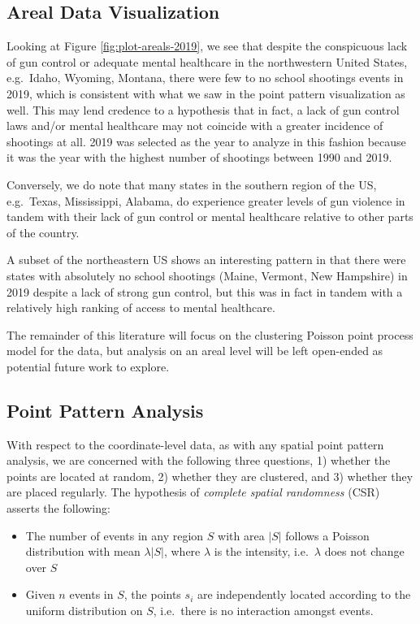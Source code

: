 \documentclass[12pt]{article}
\providecommand{\tightlist}{%
  \setlength{\itemsep}{0pt}\setlength{\parskip}{0pt}}
\begin{document}
\hypertarget{areal-data-visualization}{%
\subsection{Areal Data Visualization}\label{areal-data-visualization}}

Looking at Figure \ref{fig:plot-areals-2019}, we see that despite the conspicuous lack of gun control or adequate mental healthcare in the northwestern United States, e.g.~Idaho, Wyoming, Montana, there were few to no school shootings events in 2019, which is consistent with what we saw in the point pattern visualization as well. This may lend credence to a hypothesis that in fact, a lack of gun control laws and/or mental healthcare may not coincide with a greater incidence of shootings at all. 2019 was selected as the year to analyze in this fashion because it was the year with the highest number of shootings between 1990 and 2019.

Conversely, we do note that many states in the southern region of the US, e.g.~Texas, Mississippi, Alabama, do experience greater levels of gun violence in tandem with their lack of gun control or mental healthcare relative to other parts of the country.

A subset of the northeastern US shows an interesting pattern in that there were states with absolutely no school shootings (Maine, Vermont, New Hampshire) in 2019 despite a lack of strong gun control, but this was in fact in tandem with a relatively high ranking of access to mental healthcare.

The remainder of this literature will focus on the clustering Poisson point process model for the data, but analysis on an areal level will be left open-ended as potential future work to explore.

\hypertarget{point-pattern-analysis}{%
\subsection{Point Pattern Analysis}\label{point-pattern-analysis}}

With respect to the coordinate-level data, as with any spatial point pattern analysis, we are concerned with the following three questions, 1) whether the points are located at random, 2) whether they are clustered, and 3) whether they are placed regularly. The hypothesis of \emph{complete spatial randomness} (CSR) asserts the following:

\begin{itemize}
\tightlist
\item
  The number of events in any region \(S\) with area \(|S|\) follows a Poisson distribution with mean \(\lambda |S|\), where \(\lambda\) is the intensity, i.e.~\(\lambda\) does not change over \(S\)
\item
  Given \(n\) events in \(S\), the points \(s_i\) are independently located according to the uniform distribution on \(S\), i.e.~there is no interaction amongst events.
\end{itemize}
\end{document}
